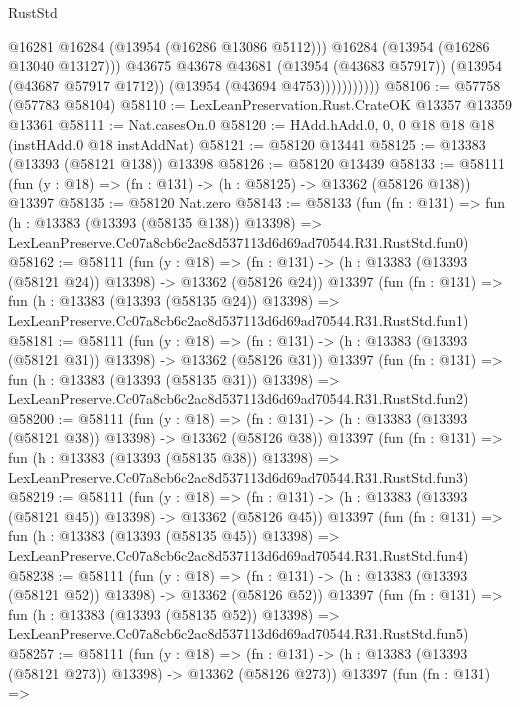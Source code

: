 \begin{lexlean}{RustStd}
\begin{coremodule}
                          @16281
                          @16284
                          (@13954 (@16286 @13086 @5112)))
                        @16284
                        (@13954 (@16286 @13040 @13127)))
                      @43675
                      @43678
                      @43681
                      (@13954 (@43683 @57917))
                      (@13954 (@43687 @57917 @1712))
                      (@13954 (@43694 @4753)))))))))))
@58106 := @57758 (@57783 @58104)
@58110 := LexLeanPreservation.Rust.CrateOK @13357 @13359 @13361
@58111 := Nat.casesOn.{0}
@58120 := HAdd.hAdd.{0, 0, 0} @18 @18 @18 (instHAdd.{0} @18 instAddNat)
@58121 := @58120 @13441
@58125 := @13383 (@13393 (@58121 @138)) @13398
@58126 := @58120 @13439
@58133 := @58111 (fun (y : @18) => (fn : @131) -> (h : @58125) -> @13362 (@58126 @138)) @13397
@58135 := @58120 Nat.zero
@58143 := @58133
    (fun (fn : @131) =>
    fun (h : @13383 (@13393 (@58135 @138)) @13398) =>
    LexLeanPreserve.Cc07a8cb6c2ac8d537113d6d69ad70544.R31.RustStd.fun0)
@58162 := @58111
    (fun (y : @18) =>
    (fn : @131) -> (h : @13383 (@13393 (@58121 @24)) @13398) -> @13362 (@58126 @24))
    @13397
    (fun (fn : @131) =>
    fun (h : @13383 (@13393 (@58135 @24)) @13398) =>
    LexLeanPreserve.Cc07a8cb6c2ac8d537113d6d69ad70544.R31.RustStd.fun1)
@58181 := @58111
    (fun (y : @18) =>
    (fn : @131) -> (h : @13383 (@13393 (@58121 @31)) @13398) -> @13362 (@58126 @31))
    @13397
    (fun (fn : @131) =>
    fun (h : @13383 (@13393 (@58135 @31)) @13398) =>
    LexLeanPreserve.Cc07a8cb6c2ac8d537113d6d69ad70544.R31.RustStd.fun2)
@58200 := @58111
    (fun (y : @18) =>
    (fn : @131) -> (h : @13383 (@13393 (@58121 @38)) @13398) -> @13362 (@58126 @38))
    @13397
    (fun (fn : @131) =>
    fun (h : @13383 (@13393 (@58135 @38)) @13398) =>
    LexLeanPreserve.Cc07a8cb6c2ac8d537113d6d69ad70544.R31.RustStd.fun3)
@58219 := @58111
    (fun (y : @18) =>
    (fn : @131) -> (h : @13383 (@13393 (@58121 @45)) @13398) -> @13362 (@58126 @45))
    @13397
    (fun (fn : @131) =>
    fun (h : @13383 (@13393 (@58135 @45)) @13398) =>
    LexLeanPreserve.Cc07a8cb6c2ac8d537113d6d69ad70544.R31.RustStd.fun4)
@58238 := @58111
    (fun (y : @18) =>
    (fn : @131) -> (h : @13383 (@13393 (@58121 @52)) @13398) -> @13362 (@58126 @52))
    @13397
    (fun (fn : @131) =>
    fun (h : @13383 (@13393 (@58135 @52)) @13398) =>
    LexLeanPreserve.Cc07a8cb6c2ac8d537113d6d69ad70544.R31.RustStd.fun5)
@58257 := @58111
    (fun (y : @18) =>
    (fn : @131) -> (h : @13383 (@13393 (@58121 @273)) @13398) -> @13362 (@58126 @273))
    @13397
    (fun (fn : @131) =>

\end{coremodule}
\end{lexlean}
